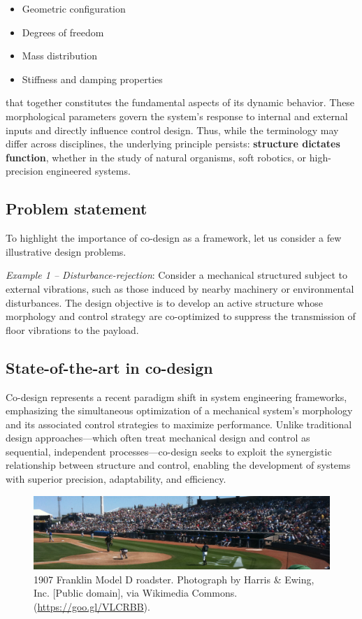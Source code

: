 \begin{itemize}
  \item Geometric configuration
  \item Degrees of freedom
  \item Mass distribution
  \item Stiffness and damping properties
\end{itemize}

\noindent that together constitutes the fundamental aspects of its
dynamic behavior. These morphological parameters govern the system's
response to internal and external inputs and directly influence control
design. Thus, while the terminology may differ across disciplines, the
underlying principle persists: \textbf{structure dictates function},
whether in the study of natural organisms, soft robotics, or
high-precision engineered systems.

\hypertarget{problem-statement}{%
\subsection{Problem statement}\label{problem-statement}}

To highlight the importance of co-design as a framework, let us consider
a few illustrative design problems.

\emph{Example 1 -- Disturbance-rejection}: Consider a mechanical
structured subject to external vibrations, such as those induced by
nearby machinery or environmental disturbances. The design objective is
to develop an active structure whose morphology and control strategy are
co-optimized to suppress the transmission of floor vibrations to the
payload.

\hypertarget{state-of-the-art-in-co-design}{%
\subsection{State-of-the-art in
co-design}\label{state-of-the-art-in-co-design}}

Co-design represents a recent paradigm shift in system engineering
frameworks, emphasizing the simultaneous optimization of a mechanical
system's morphology and its associated control strategies to maximize
performance. Unlike traditional design approaches---which often treat
mechanical design and control as sequential, independent
processes---co-design seeks to exploit the synergistic relationship
between structure and control, enabling the development of systems with
superior precision, adaptability, and efficiency.

\begin{figure}[!h]
  \includegraphics[width=\textwidth]{sampleteaser.pdf}
  \caption{1907 Franklin Model D roadster. Photograph by Harris \&
    Ewing, Inc. [Public domain], via Wikimedia
    Commons. (\url{https://goo.gl/VLCRBB}).}
\end{figure}

\lipsum[2-3]
